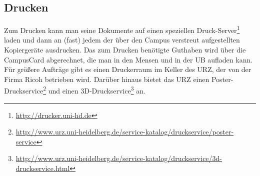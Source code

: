 
\subsection*{Drucken}

Zum Drucken kann man seine Dokumente auf einen speziellen Druck-Server\footnote{\url{http://drucker.uni-hd.de}} laden und dann an (fast) jedem der über den Campus verstreut aufgestellten Kopiergeräte ausdrucken.
Das zum Drucken benötigte Guthaben wird über die CampusCard abgerechnet, die man in den Mensen und in der \gls{UB} aufladen kann. Für größere Aufträge gibt es einen Druckerraum im Keller des \gls{URZ}, der von der Firma Ricoh betrieben wird.
Darüber hinaus bietet das URZ einen Poster-Druckservice\footnote{\url{http://www.urz.uni-heidelberg.de/service-katalog/druckservice/poster-service}} und einen 3D-Druckservice\footnote{\url{http://www.urz.uni-heidelberg.de/service-katalog/druckservice/3d-druckservice.html}} an.

